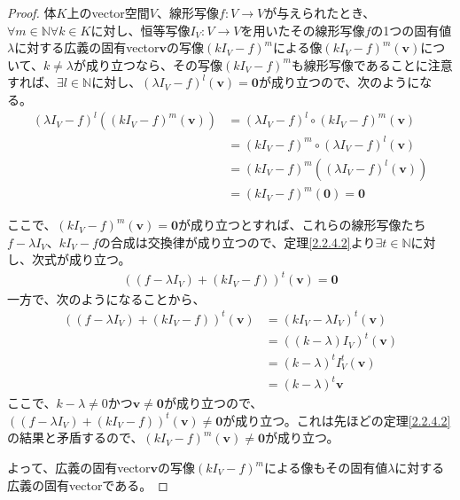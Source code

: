 \documentclass[dvipdfmx]{jsarticle}
\begin{document}
\begin{proof}
体$K$上のvector空間$V$、線形写像$f:V \rightarrow V$が与えられたとき、$\forall m \in \mathbb{N}\forall k \in K$に対し、恒等写像$I_{V}:V \rightarrow V$を用いたその線形写像$f$の1つの固有値$\lambda$に対する広義の固有vector$\mathbf{v}$の写像$\left( kI_{V} - f \right)^{m}$による像$\left( kI_{V} - f \right)^{m}\left( \mathbf{v} \right)$について、$k \neq \lambda$が成り立つなら、その写像$\left( kI_{V} - f \right)^{m}$も線形写像であることに注意すれば、$\exists l \in \mathbb{N}$に対し、$\left( \lambda I_{V} - f \right)^{l}\left( \mathbf{v} \right) = \mathbf{0}$が成り立つので、次のようになる。
\begin{align*}
\left( \lambda I_{V} - f \right)^{l}\left( \left( kI_{V} - f \right)^{m}\left( \mathbf{v} \right) \right) &= \left( \lambda I_{V} - f \right)^{l} \circ \left( kI_{V} - f \right)^{m}\left( \mathbf{v} \right)\\
&= \left( kI_{V} - f \right)^{m} \circ \left( \lambda I_{V} - f \right)^{l}\left( \mathbf{v} \right)\\
&= \left( kI_{V} - f \right)^{m}\left( \left( \lambda I_{V} - f \right)^{l}\left( \mathbf{v} \right) \right)\\
&= \left( kI_{V} - f \right)^{m}\left( \mathbf{0} \right) = \mathbf{0}
\end{align*}\par
ここで、$\left( kI_{V} - f \right)^{m}\left( \mathbf{v} \right) = \mathbf{0}$が成り立つとすれば、これらの線形写像たち$f - \lambda I_{V}$、$kI_{V} - f$の合成は交換律が成り立つので、定理\ref{2.2.4.2}より$\exists t \in \mathbb{N}$に対し、次式が成り立つ。
\begin{align*}
\left( \left( f - \lambda I_{V} \right) + \left( kI_{V} - f \right) \right)^{t}\left( \mathbf{v} \right) = \mathbf{0}
\end{align*}
一方で、次のようになることから、
\begin{align*}
\left( \left( f - \lambda I_{V} \right) + \left( kI_{V} - f \right) \right)^{t}\left( \mathbf{v} \right) &= \left( kI_{V} - \lambda I_{V} \right)^{t}\left( \mathbf{v} \right)\\
&= \left( (k - \lambda)I_{V} \right)^{t}\left( \mathbf{v} \right)\\
&= (k - \lambda)^{t}I_{V}^{t}\left( \mathbf{v} \right)\\
&= (k - \lambda)^{t}\mathbf{v}
\end{align*}
ここで、$k - \lambda \neq 0$かつ$\mathbf{v} \neq \mathbf{0}$が成り立つので、$\left( \left( f - \lambda I_{V} \right) + \left( kI_{V} - f \right) \right)^{t}\left( \mathbf{v} \right) \neq \mathbf{0}$が成り立つ。これは先ほどの定理\ref{2.2.4.2}の結果と矛盾するので、$\left( kI_{V} - f \right)^{m}\left( \mathbf{v} \right) \neq \mathbf{0}$が成り立つ。\par
よって、広義の固有vector$\mathbf{v}$の写像$\left( kI_{V} - f \right)^{m}$による像もその固有値$\lambda$に対する広義の固有vectorである。
\end{proof}
\end{document}
